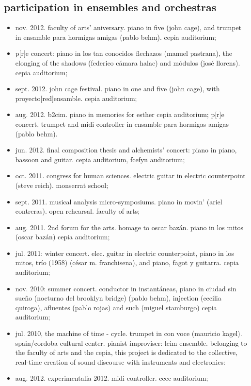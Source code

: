 \documentclass{book}
\begin{document}
\subsection{participation in ensembles and orchestras}
\begin{itemize}
\item nov. 2012. faculty of arts’ aniversary. piano in five (john cage), and trumpet in ensamble para hormigas amigas (pablo behm). cepia auditorium; 
\item p[r]e concert: piano in los tan conocidos flechazos (manuel pastrana), the elonging of the shadows (federico cámara halac) and módulos (josé llorens). cepia auditorium;
\item sept. 2012. john cage festival. piano in one and five (john cage), with proyecto[red]ensamble. cepia auditorium;
\item aug. 2012. b2cim. piano in memories for esther cepia auditorium; p[r]e concert. trumpet and midi controller in ensamble para hormigas amigas (pablo behm).
\item jun. 2012. final composition thesis and alchemists’ concert: piano in piano, bassoon and guitar. cepia auditorium, fcefyn auditorium;
\item oct. 2011. congress for human sciences. electric guitar in electric counterpoint (steve reich). monserrat school;
\item sept. 2011. musical analysis micro-symposiums. piano in movin’ (ariel contreras). open rehearsal. faculty of arts;
\item aug. 2011. 2nd forum for the arts. homage to oscar bazán. piano in los mitos (oscar bazán) cepia auditorium;
\item jul. 2011: winter concert. elec. guitar in electric counterpoint, piano in los mitos, trío (1958) (césar m. franchisena), and piano, fagot y guitarra. cepia auditorium;
\item nov. 2010: summer concert. conductor in instantáneas, piano in ciudad sin sueño (nocturno del brooklyn bridge) (pablo behm), injection (cecilia quiroga), afluentes (pablo rojas) and such (miguel stamburgo) cepia auditorium;
\item jul. 2010, the machine of time - cycle. trumpet in con voce (mauricio kagel). spain/cordoba cultural center.
pianist improviser: leim ensemble. belonging to the faculty of arts and the cepia, this project is dedicated to the collective, real-time creation of sound discourse with instruments and electronics:
\item aug. 2012. experimentalia 2012. midi controller. ccec auditorium;

\end{itemize}
\end{document}
